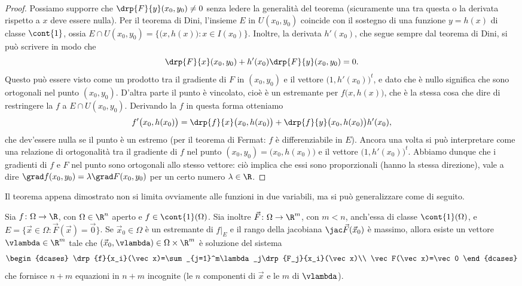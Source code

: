 \begin{proof}
	Possiamo supporre che $\drp{F}{y}(x_0,y_0)\neq 0$ senza ledere la generalità del teorema (sicuramente una tra questa o la derivata rispetto a $x$ deve essere nulla).
	Per il teorema di Dini, l'insieme $E$ in $U(x_0,y_0)$ coincide con il sostegno di una funzione $y=h(x)$ di classe $\cont{1}$, ossia $E\cap U(x_0,y_0)=\{\big(x,h(x)\big)\colon x\in I(x_0)\}$.
	Inoltre, la derivata $h'(x_0)$, che segue sempre dal teorema di Dini, si può scrivere in modo che
	\begin{equation}
		\drp{F}{x}(x_0,y_0)+h'(x_0)\drp{F}{y}(x_0,y_0)=0.
	\end{equation}
	Questo può essere visto come un prodotto tra il gradiente di $F$ in $(x_0,y_0)$ e il vettore $\big(1,h'(x_0)\big)^t$, e dato che è nullo significa che sono ortogonali nel punto $(x_0,y_0)$.
	D'altra parte il punto è vincolato, cioè è un estremante per $f\big(x,h(x)\big)$, che è la stessa cosa che dire di restringere la $f$ a $E\cap U(x_0,y_0)$.
	Derivando la $f$ in questa forma otteniamo
	\begin{equation*}
		f'\big(x_0,h(x_0)\big)=\drp{f}{x}\big(x_0,h(x_0)\big)+\drp{f}{y}\big(x_0,h(x_0)\big)h'(x_0),
	\end{equation*}
	che dev'essere nulla se il punto è un estremo (per il teorema di Fermat: $f$ è differenziabile in $E$).
	Ancora una volta si può interpretare come una relazione di ortogonalità tra il gradiente di $f$ nel punto $(x_0,y_0)=\big(x_0,h(x_0)\big)$ e il vettore $\big(1,h'(x_0)\big)^t$.
	Abbiamo dunque che i gradienti di $f$ e $F$ nel punto sono ortogonali allo stesso vettore: ciò implica che essi sono proporzionali (hanno la stessa direzione), vale a dire $\grad f(x_0,y_0)=\lambda\grad F(x_0,y_0)$ per un certo numero $\lambda\in\R$.
\end{proof}
Il teorema appena dimostrato non si limita ovviamente alle funzioni in due variabili, ma si può generalizzare come di seguito.
\begin{teorema} \label{t:moltiplicatori-lagrange}
	Sia $f\colon\Omega\to\R$, con $\Omega\in\R^n$ aperto e $f\in\cont{1}(\Omega)$. Sia inoltre $\vec F\colon\Omega\to\R^m$, con $m<n$, anch'essa di classe $\cont{1}(\Omega)$, e $E=\{\vec x\in\Omega\colon\vec F(\vec x)=\vec 0\}$.
	Se $\vec x_0\in\Omega$ è un estremante di $f|_E$ e il rango della jacobiana $\jac\vec F(\vec x_0)$ è massimo, allora esiste un vettore $\vlambda\in\R^m$ tale che $(\vec x_0,\vlambda)\in\Omega\times\R^m$ è soluzione del sistema
	\begin{equation} 
		\begin{dcases}
			\drp{f}{x_i}(\vec x)=\sum_{j=1}^m\lambda_j\drp{F_j}{x_i}(\vec x)\\
			\vec F(\vec x)=\vec 0
		\end{dcases}
		\label{eq:moltiplicatori-lagrange}
	\end{equation}
	che fornisce $n+m$ equazioni in $n+m$ incognite (le $n$ componenti di $\vec x$ e le $m$ di $\vlambda$).
\end{teorema}
